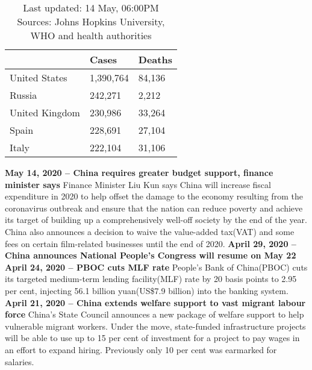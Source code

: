 \documentclass[11pt, a4paper]{article}
\begin{document}
            \begin{table}[H]
                \centering
                \begin{tabular}{p{7.96cm}P{3.98cm}P{3.98cm}}
                    & Cases & Deaths\\
                    \hline
                    United States & 1,390,764 & 84,136\\
                    \hline
                    Russia & 242,271 & 2,212\\
                    \hline
                    United Kingdom & 230,986 & 33,264\\
                    \hline
                    Spain & 228,691 & 27,104\\
                    \hline
                    Italy & 222,104 & 31,106\\
                    \hline
                \end{tabular}
                \caption*{Last updated: 14 May, 06:00PM \\
                Sources: Johns Hopkins University, WHO and health authorities}
            \end{table} 

            \textbf{May 14, 2020 – China requires greater budget support, finance minister says}
            \bigbreak
            Finance Minister Liu Kun says China will increase fiscal expenditure in 2020 to help offset the damage to the economy resulting from the coronavirus outbreak and ensure that the nation can reduce poverty and achieve its target of building up a comprehensively well-off society by the end of the year.
            \bigbreak
            China also announces a decision to waive the value-added tax(VAT) and some fees on certain film-related businesses until the end of 2020.
            \bigbreak
            \noindent
            \textbf{\Large April 29, 2020 – China announces National People’s Congress will resume on May 22}
            \bigbreak
            \noindent
            \textbf{April 24, 2020 – PBOC cuts MLF rate}
            \bigbreak
            People’s Bank of China(PBOC) cuts its targeted medium-term lending facility(MLF) rate by 20 basis points to 2.95 per cent, injecting 56.1 billion yuan(US\$7.9 billion) into the banking system.
            \bigbreak
            \noindent
            \textbf{April 21, 2020 – China extends welfare support to vast migrant labour force}
            \bigbreak
            China’s State Council announces a new package of welfare support to help vulnerable migrant workers.
            \bigbreak
            Under the move, state-funded infrastructure projects will be able to use up to 15 per cent of investment for a project to pay wages in an effort to expand hiring. Previously only 10 per cent was earmarked for salaries.
            \bigbreak
\end{document}
